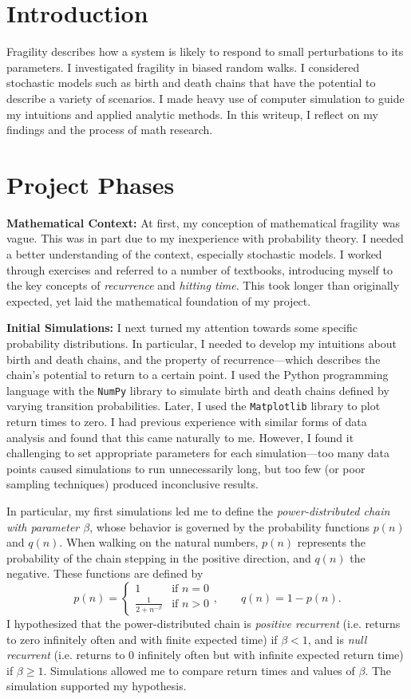 \documentclass[12pt,letterpaper]{article}
\begin{document}
\section*{Introduction}
Fragility describes how a system is likely to respond to small perturbations to its parameters.
I investigated fragility in biased random walks. I considered stochastic models such as birth
and death chains that have the potential to describe a variety of scenarios. I made heavy use of
computer simulation to guide my intuitions and applied analytic methods. In this writeup, I reflect
on my findings and the process of math research.


\section*{Project Phases}
\noindent
\textbf{Mathematical Context:} At first, my conception of mathematical fragility was vague. This was in
part due to my inexperience with probability theory. I needed a better understanding of the context,
especially stochastic models. I worked through exercises and referred to a number of textbooks,
introducing myself to the key concepts of \emph{recurrence} and \emph{hitting time}. This took longer
than originally expected, yet laid the mathematical foundation of my project.

\noindent
\textbf{Initial Simulations:} I next turned my attention towards some specific probability
distributions. In particular, I needed to develop my intuitions about birth and death chains, and the
property of recurrence---which describes the chain's potential to return to a certain point. I used the
Python programming language with the \texttt{NumPy} library to simulate birth and death chains defined
by varying transition probabilities. Later, I used the \texttt{Matplotlib} library to plot return times
to zero. I had previous experience with similar forms of data analysis and found that this came
naturally to me.  However, I found it challenging to set appropriate parameters for each
simulation---too many data points caused simulations to run unnecessarily long, but too few (or poor
sampling techniques) produced inconclusive results.

In particular, my first simulations led me to define the \emph{power-distributed chain with parameter
$\beta$}, whose behavior is governed by the probability functions $p(n)$ and $q(n)$. When walking on the
natural numbers, $p(n)$ represents the probability of the chain stepping in the positive direction, and
$q(n)$ the negative. These functions are defined by
\[
    p(n) = \begin{cases}
        1 & \text{if } n = 0 \\
        \frac{1}{2+n^{-\beta}} & \text{if } n > 0
    \end{cases}, \quad \quad
    q(n) = 1-p(n).
\]
I hypothesized that the power-distributed chain is \emph{positive recurrent} (i.e. returns to zero
infinitely often and with finite expected time) if $\beta < 1$, and is \emph{null recurrent} (i.e.
returns to $0$ infinitely often but with infinite expected return time) if $\beta \geq 1$. Simulations
allowed me to compare return times and values of $\beta$. The simulation supported my hypothesis.
\end{document}
